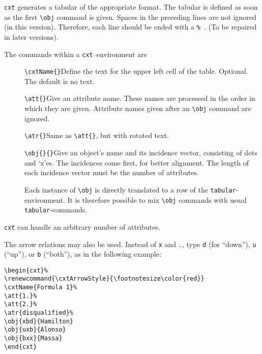 \documentclass[12pt]{article}
\begin{document}
\texttt{cxt} generates a tabular of the appropriate format. The tabular is
defined as soon as the first \verb|\obj| command is given. Spaces in the 
preceding lines are not ignored (in this version). Therefore, each line should
be ended with a \texttt{\%}\ . (To be repaired in later versions).
\medbreak
 
The commands within a \texttt{cxt}--environment are

\begin{description}
\item[]\verb|\cxtName{}|\quad Define the text for the upper left cell of the
  table. Optional. The default is no text.
\item[]\verb|\att{}|\quad Give an attribute name. These names are processed
  in the order in which they are given. Attribute names given after an
  \verb|\obj|  command are ignored.
\item[]\verb|\atr{}|\quad Same as \verb|\att{}|, but with rotated text.
\item[]\verb|\obj{}{}|\quad Give an object's name and its incidence vector,
  consisting of dots and `x'es. The incidences come first, for better
  alignment. The length of each incidence vector must be the number of
  attributes. 

Each  instance of \verb|\obj| is directly translated to a row of the
\verb|tabular|-environment. It is therefore possible to mix  \verb|\obj|
commands with usual  \verb|tabular|-commands.
\end{description}
\texttt{cxt} can handle an arbitrary number of attributes.
\bigbreak

The arrow relations may also be used. Instead of \texttt{x} and \texttt{.},
type \texttt{d} (for ``down''), \texttt{u} (``up''), or \texttt{b} (``both''), 
as in the following example:\bigbreak 

\noindent\begin{minipage}{.45\textwidth}
\begin{verbatim}
\begin{cxt}%
\renewcommand{\cxtArrowStyle}{\footnotesize\color{red}}
\cxtName{Formula 1}%
\att{1.}%
\att{2.}%
\atr{disqualified}%
\obj{xbd}{Hamilton}
\obj{uxb}{Alonso}
\obj{bxx}{Massa}
\end{cxt}
\end{verbatim}
\end{minipage}
\hfill
\begin{minipage}{.40\textwidth}
\strut\par\strut\par
\begin{cxt}%
\renewcommand{\cxtArrowStyle}{\footnotesize\color{red}}
%
%
%
%
\end{cxt}
\end{minipage}
\bigbreak
\end{document}
